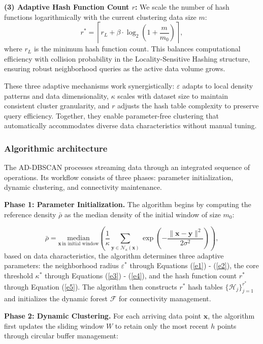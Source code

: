 \documentclass[preprint,12pt,authoryear]{elsarticle}
\theoremstyle{definition}
\begin{document}
\textbf{(3) Adaptive Hash Function Count $r$:} We scale the number of hash functions logarithmically with the current clustering data size $m$:
\begin{equation}
r^* = \left\lceil r_L + \beta \cdot \log_2\left(1 + \frac{m}{m_0}\right) \right\rceil,
\label{e5}
\end{equation}
where $r_L$ is the minimum hash function count. This balances computational efficiency with collision probability in the Locality-Sensitive Hashing structure, ensuring robust neighborhood queries as the active data volume grows.

These three adaptive mechanisms work synergistically: $\varepsilon$ adapts to local density patterns and data dimensionality, $\kappa$ scales with dataset size to maintain consistent cluster granularity, and $r$ adjusts the hash table complexity to preserve query efficiency. Together, they enable parameter-free clustering that automatically accommodates diverse data characteristics without manual tuning.

\subsubsection{Algorithmic architecture}

The AD-DBSCAN processes streaming data through an integrated sequence of operations. Its workflow consists of three phases: parameter initialization, dynamic clustering, and connectivity maintenance.

\textbf{Phase 1: Parameter Initialization.} The algorithm begins by computing the reference density $\bar{\rho}$ as the median density of the initial window of size $m_0$:

\begin{equation}    
\bar{\rho} = \underset{\bm{x}\,\text{in initial window}}{\text{median}} \left( \frac{1}{\kappa}\sum_{\bm{y} \in \mathcal{N}_\kappa(\bm{x})} \exp\left(-\frac{\|\bm{x} - \bm{y}\|^2}{2\sigma^2}\right) \right),
\end{equation}
based on data characteristics, the algorithm determines three adaptive parameters: the neighborhood radius $\varepsilon^*$ through Equations (\ref{e1}) - (\ref{e2}), the core threshold $\kappa^*$ through Equations (\ref{e3}) - (\ref{e4}), and the hash function count $r^*$ through Equation (\ref{e5}). The algorithm then constructs $r^*$ hash tables $\{\mathcal{H}_j\}_{j=1}^{r^*}$ and initializes the dynamic forest $\mathcal{F}$ for connectivity management.

\textbf{Phase 2: Dynamic Clustering.} For each arriving data point $\bm{x}$, the algorithm first updates the sliding window $W$ to retain only the most recent $h$ points through circular buffer management:
\end{document}
